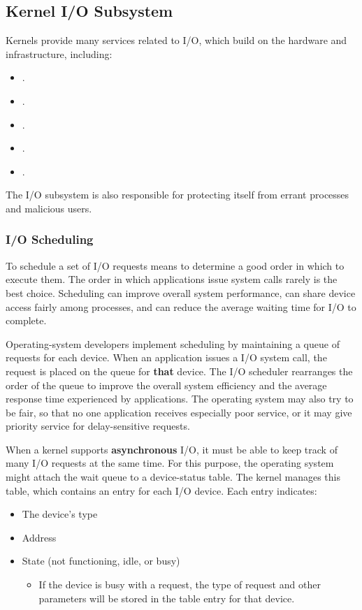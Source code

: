 \subsection{Kernel I/O Subsystem}\label{subsec:Kernel_IO_Subsystem}
Kernels provide many services related to I/O, which build on the hardware and  infrastructure, including:
\begin{itemize}[noitemsep]
\item {}.
\item {}.
\item {}.
\item {}.
\item {}.
\end{itemize}

The I/O subsystem is also responsible for protecting itself from errant processes and malicious users.

\subsubsection{I/O Scheduling}\label{subsubsec:IO_Scheduling}
To schedule a set of I/O requests means to determine a good order in which to execute them.
The order in which applications issue system calls rarely is the best choice.
Scheduling can improve overall system performance, can share device access fairly among processes, and can reduce the average waiting time for I/O to complete.

Operating-system developers implement scheduling by maintaining a queue of requests for each device.
When an application issues a  I/O system call, the request is placed on the queue for \textbf{that} device.
The I/O scheduler rearranges the order of the queue to improve the overall system efficiency and the average response time experienced by applications.
The operating system may also try to be fair, so that no one application receives especially poor service, or it may give priority service for delay-sensitive requests.

When a kernel supports \textbf{asynchronous} I/O, it must be able to keep track of many I/O requests at the same time.
For this purpose, the operating system might attach the wait queue to a device-status table.
The kernel manages this table, which contains an entry for each I/O device.
Each entry indicates:
\begin{itemize}[noitemsep]
\item The device's type
\item Address
\item State (not functioning, idle, or busy)
  \begin{itemize}[noitemsep]
  \item If the device is busy with a request, the type of request and other parameters will be stored in the table entry for that device.
  \end{itemize}
\end{itemize}


